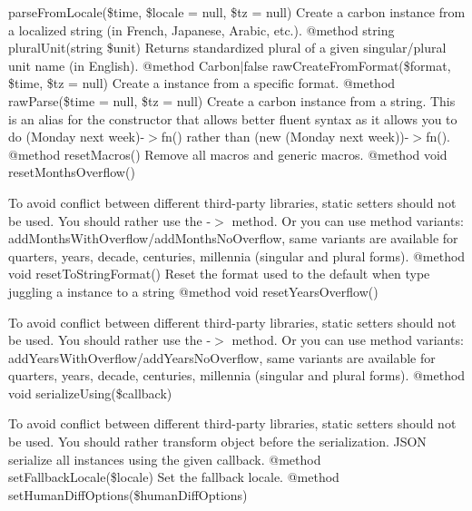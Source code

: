 \begin{DoxyRefList}
parse\+From\+Locale(\$time, \$locale = null, \$tz = null) Create a carbon instance from a localized string (in French, Japanese, Arabic, etc.). @method string plural\+Unit(string \$unit) Returns standardized plural of a given singular/plural unit name (in English). @method Carbon\texorpdfstring{$\vert$}{|}false raw\+Create\+From\+Format(\$format, \$time, \$tz = null) Create a  instance from a specific format. @method  raw\+Parse(\$time = null, \$tz = null) Create a carbon instance from a string. This is an alias for the constructor that allows better fluent syntax as it allows you to do (\textquotesingle{}Monday next week\textquotesingle{})-\/\texorpdfstring{$>$}{>}fn() rather than (new (\textquotesingle{}Monday next week\textquotesingle{}))-\/\texorpdfstring{$>$}{>}fn(). @method  reset\+Macros() Remove all macros and generic macros. @method void reset\+Months\+Overflow() 



To avoid conflict between different third-\/party libraries, static setters should not be used. You should rather use the -\/\texorpdfstring{$>$}{>} method. Or you can use method variants\+: add\+Months\+With\+Overflow/add\+Months\+No\+Overflow, same variants are available for quarters, years, decade, centuries, millennia (singular and plural forms). @method void reset\+To\+String\+Format() Reset the format used to the default when type juggling a  instance to a string @method void reset\+Years\+Overflow() 



To avoid conflict between different third-\/party libraries, static setters should not be used. You should rather use the -\/\texorpdfstring{$>$}{>} method. Or you can use method variants\+: add\+Years\+With\+Overflow/add\+Years\+No\+Overflow, same variants are available for quarters, years, decade, centuries, millennia (singular and plural forms). @method void serialize\+Using(\$callback) 



To avoid conflict between different third-\/party libraries, static setters should not be used. You should rather transform  object before the serialization. JSON serialize all  instances using the given callback. @method  set\+Fallback\+Locale(\$locale) Set the fallback locale. @method  set\+Human\+Diff\+Options(\$human\+Diff\+Options) 




\end{DoxyRefList}
